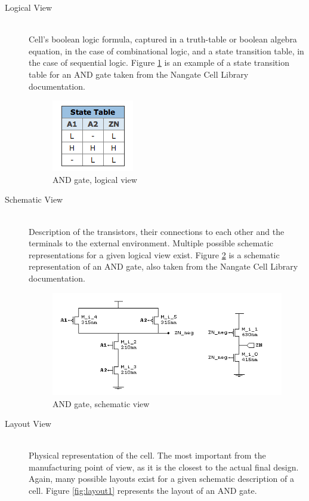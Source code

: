 \begin{description}

  \item[Logical View]  \hfill \\
	Cell's boolean logic formula, captured in a truth-table or boolean algebra equation, in the case of combinational logic, and a state transition table, in the case of sequential logic. Figure \ref{fig:logic1} is an example of a state transition table for an AND gate taken from the Nangate Cell Library documentation.
	
	
\begin{figure}[h!]
  \centering
  \includegraphics[scale=0.8]{img/bckgrnd/ANDlogic.png}
  \caption{AND gate, logical view}
  \label{fig:logic1}
\end{figure}

	
  \item[Schematic View]  \hfill \\
	Description of the transistors, their connections to each other and the terminals to the external environment. Multiple possible schematic representations for a given logical view exist. Figure \ref{fig:schematic1} is a schematic representation of an AND gate, also taken from the Nangate Cell Library documentation.
	
\begin{figure}[h!]
  \centering
  \includegraphics[scale=0.8]{img/bckgrnd/ANDschematic.png}
  \caption{AND gate, schematic view}
  \label{fig:schematic1}
\end{figure}

	
	
  \item[Layout View]  \hfill \\
	Physical representation of the cell. The most important from the manufacturing point of view, as it is the closest to the actual final design. Again, many possible layouts exist for a given schematic description of a cell. Figure \ref{fig:layout1} represents the layout of an AND gate.
	

\end{description}
